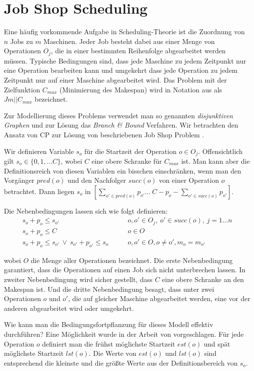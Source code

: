\section{Job Shop Scheduling}

Eine häufig vorkommende Aufgabe in Scheduling-Theorie ist die Zuordnung von $n$ Jobs zu $m$ Maschinen. Jeder Job besteht dabei aus einer Menge von Operationen $O_j$, die in einer bestimmten Reihenfolge abgearbeitet werden müssen. Typische Bedingungen sind, dass jede Maschine zu jedem Zeitpunkt nur eine Operation bearbeiten kann und umgekehrt dass jede Operation zu jedem Zeitpunkt nur auf einer Maschine abgearbeitet wird. Das Problem mit der Zielfunktion $C_{max}$ (Minimierung des Makespan) wird in Notation aus \cite{Pinedo} als $Jm||C_{max}$ bezeichnet.

Zur Modellierung dieses Problems verwendet man so genannten {\it disjunktiven Graphen} und zur Lösung das {\it Branch \& Bound} Verfahren. Wir betrachten den Ansatz von CP zur Lösung von beschriebenen Job Shop Problem \citep[vgl.][]{CSP}.

Wir definieren Variable $s_o$ für die Startzeit der Operation $o\in O_j$. Offensichtlich gilt $s_o\in \{0,1,\dots C\}$, wobei $C$ eine obere Schranke für $C_{max}$ ist. Man kann aber die Definitionsreich von diesen Variablen ein bisschen einschränken, wenn man den Vorgänger $pred(o)$ und den Nachfolger $succ(o)$ von einer Operation $o$ betrachtet. Dann liegen $s_o$ in $[\sum_{o'\in pred(o)}p_{o'}\dots\ C-p_o-\sum_{o'\in succ(o)}p_{o'}]$.

Die Nebenbedingungen lassen sich wie folgt definieren:
\begin{align}
  s_o + p_o \le s_{o'} &\qquad  o,o'\in O_j,\ o'\in succ(o),\ j=1\dots n \nonumber \\
  s_o + p_o \le C &\qquad  o\in O \nonumber \\
  s_o + p_o \le s_{o'}\ \vee\ s_{o'} + p_{o'} \le s_{o} &\qquad o,o'\in O, o\not=o', m_o=m_{o'} \nonumber 
\end{align}

wobei $O$ die Menge aller Operationen bezeichnet.
Die erste Nebenbedingung garantiert, dass die Operationen auf einen Job sich nicht unterbrechen lassen. In zweiter Nebenbedingung wird sicher gestellt, dass $C$ eine obere Schranke an den Makespan ist. Und die dritte Nebenbedingung besagt, dass unter zwei Operationen $o$ und $o'$, die auf gleicher Maschine abgearbeitet werden, eine vor der anderen abgearbeitet wird oder umgekehrt.

Wie kann man die Bedingungsfortpflanzung für dieses Modell effektiv durchführen? Eine Möglichkeit wurde in der Arbeit von \cite{Nuijten} vorgeschlagen. Für jede Operation $o$ definiert man die frühst möglichste Startzeit $est(o)$ und spät möglichste Startzeit $lst(o)$. Die Werte von $est(o)$ und $lst(o)$ sind entsprechend die kleinste und die größte Werte aus der Definitionsbereich von $s_o$.

